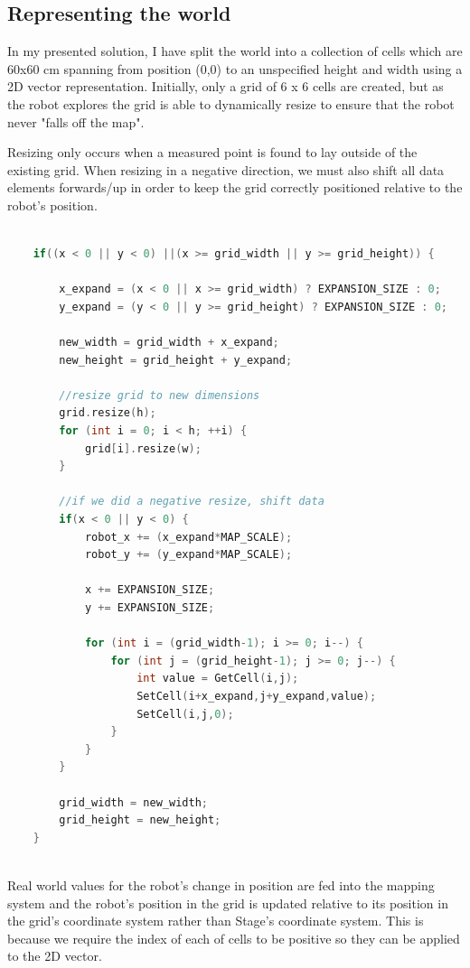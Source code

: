 \documentclass{article}
\begin{document}
\subsection{Representing the world}
In my presented solution, I have split the world into a collection of cells which are 60x60 cm spanning from position (0,0) to an unspecified height and width using a 2D vector representation. Initially, only a grid of 6 x 6 cells are created, but as the robot explores the grid is able to dynamically resize to ensure that the robot never "falls off the map". 

Resizing only occurs when a measured point is found to lay outside of the existing grid. When resizing in a negative direction, we must also shift all data elements forwards/up in order to keep the grid correctly positioned relative to the robot's position.

\begin{center}
	\begin{lstlisting}[language=c++, showstringspaces=false, caption={C++ code for dynamically resizing the grid when a point (x,y) falls outside the current grid's size}]

	if((x < 0 || y < 0) ||(x >= grid_width || y >= grid_height)) {
		
		x_expand = (x < 0 || x >= grid_width) ? EXPANSION_SIZE : 0;
		y_expand = (y < 0 || y >= grid_height) ? EXPANSION_SIZE : 0;

		new_width = grid_width + x_expand;
		new_height = grid_height + y_expand;

		//resize grid to new dimensions
		grid.resize(h);
		for (int i = 0; i < h; ++i) {
 			grid[i].resize(w);
 		}
		
		//if we did a negative resize, shift data
		if(x < 0 || y < 0) {
			robot_x += (x_expand*MAP_SCALE);
			robot_y += (y_expand*MAP_SCALE);

			x += EXPANSION_SIZE;
			y += EXPANSION_SIZE;

			for (int i = (grid_width-1); i >= 0; i--) {
				for (int j = (grid_height-1); j >= 0; j--) {
					int value = GetCell(i,j);
					SetCell(i+x_expand,j+y_expand,value);
					SetCell(i,j,0);
				}
			}
		}

		grid_width = new_width;
		grid_height = new_height;
	}
		
	\end{lstlisting}
\end{center}

Real world values for the robot's change in position are fed into the mapping system and the robot's position in the grid is updated relative to its position in the grid's coordinate system rather than Stage's coordinate system. This is because we require the index of each of cells to be positive so they can be applied to the 2D vector.
\end{document}
